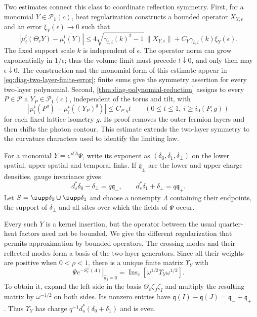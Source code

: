 Two estimates connect this class to coordinate reflection symmetry.
First, for a monomial $Y\in\mathcal P_1(c)$, heat regularization constructs a
bounded operator $X_{Y,\epsilon}$ and an error
$\xi_Y(\epsilon)\to0$ such that
\[
 |\mu_i^t(\Theta_cY)-\overline{\mu_i^t(Y)}|
 \le4\sqrt{\gamma_{t,i}(k)^2-1}\,\|X_{Y,\epsilon}\|
       +C_Y\gamma_{t,i}(k)\xi_Y(\epsilon).
\]
The fixed support scale $k$ is independent of $\epsilon$.
The operator norm can grow exponentially in $1/\epsilon$; thus the
volume limit must precede $t\downarrow0$, and only then may
$\epsilon\downarrow0$. The construction and the monomial form of
this estimate appear in \eqref{eq:diag-two-layer-finite-error};
finite sums give the symmetry assertion for every two-layer polynomial.
Second, \cref{thm:diag-polynomial-reduction} assigns to every
$P\in\mathcal P$ a $Y_P\in\mathcal P_1(c)$, independent of the
torus and tilt, with
\[
 |\mu_i^t(P^g)-\mu_i^t((Y_P)^g)|\le C_{P,g}t
 \qquad(0\le t\le1,\ i\ge i_0(P,g))
\]
for each fixed lattice isometry $g$. Its proof removes the outer
fermion layers and then shifts the photon contour. This estimate
extends the two-layer symmetry to the curvature characters used
to identify the limiting law.

For a monomial
$Y=e^{i\delta\widehat A}\Psi$, write its exponent as
$(\delta_0,\delta_1,\delta_\perp)$ on the lower spatial, upper
spatial and temporal links. If $\mathfrak q_\pm$ are the lower
and upper charge densities, gauge invariance gives
\begin{equation}\label{eq:diag-two-layer-gauss}
 d_s^*\delta_0-\delta_\perp=q\mathfrak q_-,\qquad
 d_s^*\delta_1+\delta_\perp=q\mathfrak q_+.
\end{equation}
Let $S=\supp\delta_0\cup\supp\delta_1$ and choose a nonempty $\Lambda$
containing their endpoints, the support of $\delta_\perp$ and
all sites over which the fields of $\Psi$ occur.

Every such $Y$ is a kernel insertion, but the operator between
the usual quarter-heat factors need not be bounded. We give the
different regularization that permits approximation by bounded
operators. The crossing modes and their reflected modes form a
basis of the two-layer generators. Since all their weights are
positive when $0<\rho<1$, there is a unique finite matrix
$\Upsilon_Y$ with
\begin{equation}\label{eq:diag-two-layer-matrix}
 \left.\Psi e^{-S_c^\times(\Lambda)}\right|_{\widehat a_j=0}
       =\operatorname{Ins}_c[
                      \omega^{1/2}\Upsilon_Y\omega^{1/2}].
\end{equation}
To obtain it, expand the left side in the basis
$\Theta_c\zeta_J\zeta_I$ and multiply the resulting matrix by
$\omega^{-1/2}$ on both sides. Its nonzero entries have
$\mathfrak q(I)-\mathfrak q(J)=\mathfrak q_-+\mathfrak q_+$.
Thus $\Upsilon_Y$ has charge
$q^{-1}d_s^*(\delta_0+\delta_1)$ and is even.

